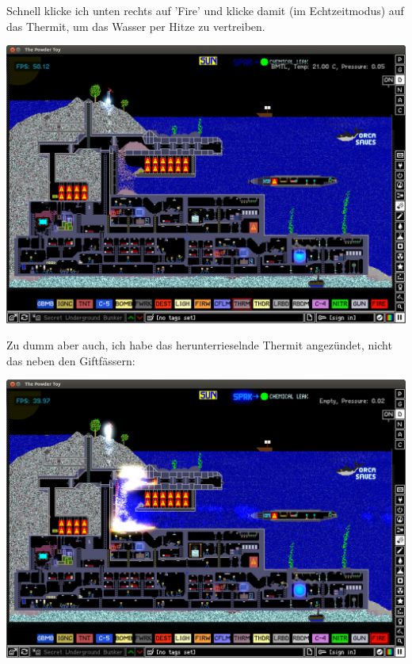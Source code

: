 \documentclass[10pt,a4paper,ngerman,twoside]{article} %
\begin{document}
\begin{multicols}{2}
Schnell klicke ich unten rechts auf 'Fire' und klicke damit (im Echtzeitmodus) auf das Thermit, um das Wasser per Hitze zu vertreiben.
\begin{center}
\includegraphics[width=\linewidth]{powdertoy/powdertoy-bu3.png}
\end{center}

Zu dumm aber auch, ich habe das herunterrieselnde Thermit angezündet, nicht das neben den Giftfässern:
\begin{center}
\includegraphics[width=\linewidth]{powdertoy/powdertoy-bu4.png}
\end{center}


\end{multicols}
\end{document}
